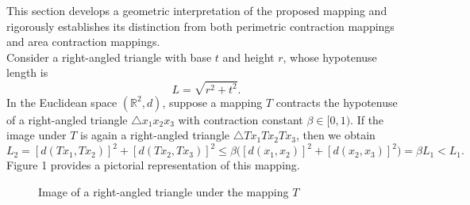\documentclass[11pt,reqno,a4paper]{amsart}
\theoremstyle{plain}
\theoremstyle{definition}
\theoremstyle{remark}
\numberwithin{equation}{section}
\begin{document}
This section develops a geometric interpretation of the proposed mapping and rigorously establishes its distinction from both perimetric contraction mappings and area contraction mappings. \\
Consider a right-angled triangle with base $t$ and height $r$, whose hypotenuse length is 
\[
L = \sqrt{r^2 + t^2}.
\]In the Euclidean space $(\mathbb{R}^2,d)$, suppose a mapping $T$ contracts the hypotenuse of a right-angled triangle $\triangle x_1x_2x_3$ with contraction constant $\beta \in [0,1)$. If the image under $T$ is again a right-angled triangle $\triangle Tx_1Tx_2Tx_3$, then we obtain
\[
L_2 = [d(Tx_1,Tx_2)]^2 + [d(Tx_2,Tx_3)]^2 
     \leq \beta \big( [d(x_1,x_2)]^2 + [d(x_2,x_3)]^2 \big) 
     = \beta L_1 < L_1.
\]
Figure 1 provides a pictorial representation of this mapping.
\newpage
\begin{figure}[htbp]
\centering
{}
\caption{Image of a right-angled triangle under the mapping $T$}
\end{figure}
\end{document}
